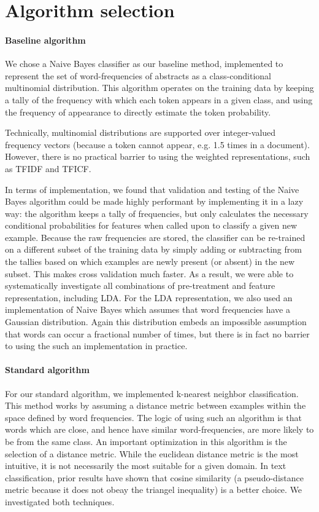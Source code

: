 \documentclass[conference,letterpaper]{IEEEtran}
\begin{document}
\section{Algorithm selection}
\paragraph{Baseline algorithm}
We chose a Naive Bayes classifier as our baseline method, implemented to 
represent the set of word-frequencies of abstracts as a class-conditional 
multinomial distribution.  This algorithm operates on the training data
by keeping a tally of the frequency with which each token appears in a given
class, and using the frequency of appearance to directly estimate the 
token probability.

Technically, multinomial distributions are supported over integer-valued
frequency vectors (because a token cannot appear, e.g. 1.5 times in a 
document).  However, there is no practical barrier to using the weighted
representations, such as TFIDF and TFICF.

In terms of implementation, we found that validation and testing of the Naive 
Bayes algorithm could be made highly performant by implementing it in a 
lazy way: the algorithm keeps a tally of frequencies, but only calculates 
the necessary conditional probabilities for features when called upon to
classify a given new example.  Because the raw frequencies are stored,
the classifier can be re-trained on a different subset of the training data
by simply adding or subtracting from the tallies based on which examples are
newly present (or absent) in the new subset.  This makes cross validation much
faster.  As a result, we were able to systematically investigate all 
combinations of pre-treatment and feature representation, including LDA.
For the LDA representation, we also used an implementation of Naive Bayes 
which assumes that word frequencies have a Gaussian distribution.  Again
this distribution embeds an impossible assumption that words can occur a 
fractional number of times, but there is in fact no barrier to using the 
such an implementation in practice.

\paragraph{Standard algorithm}
For our standard algorithm, we implemented k-nearest neighbor classification.
This method works by assuming a distance metric between examples within the
space defined by word frequencies.  The logic of using such an algorithm is 
that words which are close, and hence have similar word-frequencies, are more
likely to be from the same class.  An important optimization in this 
algorithm is the selection of a distance metric.  While the euclidean distance
metric is the most intuitive, it is not necessarily the most suitable for
a given domain.  In text classification, prior results have shown that 
cosine similarity (a pseudo-distance metric because it does not obeay the
triangel inequality) is a better choice.  We investigated both techniques.
\end{document}
